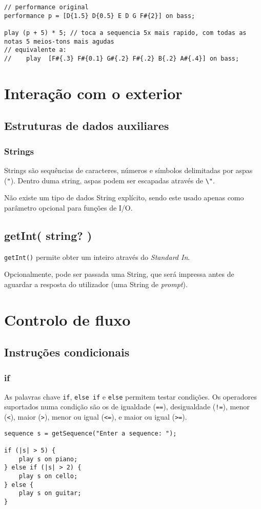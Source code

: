 \documentclass{article}
\begin{document}
\begin{lstlisting} 
// performance original
performance p = [D{1.5} D{0.5} E D G F#{2}] on bass;

play (p + 5) * 5; // toca a sequencia 5x mais rapido, com todas as notas 5 meios-tons mais agudas
// equivalente a:
//    play  [F#{.3} F#{0.1} G#{.2} F#{.2} B{.2} A#{.4}] on bass;
\end{lstlisting}

\section{Interação com o exterior} \label{exterior}
\subsection{Estruturas de dados auxiliares}
\subsubsection{Strings}
Strings são sequências de caracteres, números e símbolos delimitadas por aspas (\texttt{"}). Dentro duma string, aspas podem ser escapadas através de \texttt{\textbackslash"}.

Não existe um tipo de dados String explícito, sendo este usado apenas como parâmetro opcional para funções de I/O.
\subsection{getInt( string? )}
\texttt{getInt()} permite obter um inteiro através do \textit{Standard In}. 

Opcionalmente, pode ser passada uma String, que será impressa antes de aguardar a resposta do utilizador (uma String de \textit{prompt}).


\section{Controlo de fluxo} \label{flux}
\subsection{Instruções condicionais}
\subsubsection{if}
As palavras chave \texttt{if}, \texttt{else if} e \texttt{else} permitem testar condições. Os operadores suportados numa condição são os de igualdade (\texttt{==}), desigualdade (\texttt{!=}), menor (\texttt{<}), maior (\texttt{>}), menor ou igual (\texttt{<=}), e maior ou igual (\texttt{>=}).
\begin{lstlisting} 
sequence s = getSequence("Enter a sequence: ");

if (|s| > 5) {
    play s on piano;
} else if (|s| > 2) {
    play s on cello;
} else {
    play s on guitar;
}
\end{lstlisting}
\end{document}
